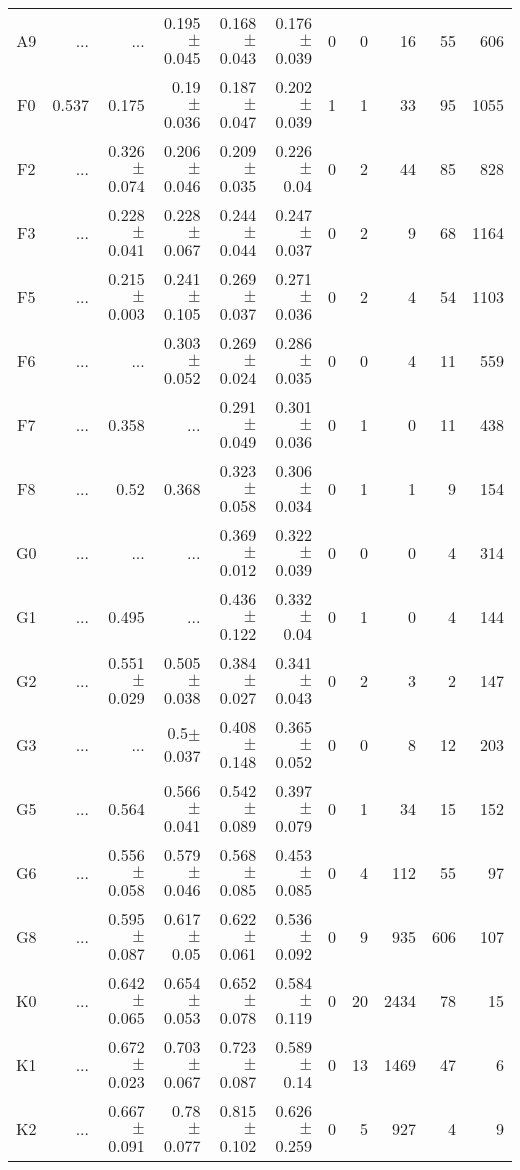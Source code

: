\begin{table}[t]
\begin{table}[t]
\begin{center}
\begin{tabular}{c|rrrrr|rrrrr}
    A9	&	 ...	&	 ...	&	0.195$\pm$0.045	&	0.168$\pm$0.043	&	0.176$\pm$0.039	&	0	&	0	&	16	&	55	&	606	\\
    F0	&	0.537	&	0.175	&	0.19$\pm$0.036	&	0.187$\pm$0.047	&	0.202$\pm$0.039	&	1	&	1	&	33	&	95	&	1055	\\
    F2	&	 ...	&	0.326$\pm$0.074	&	0.206$\pm$0.046	&	0.209$\pm$0.035	&	0.226$\pm$0.04	&	0	&	2	&	44	&	85	&	828	\\
    F3	&	 ...	&	0.228$\pm$0.041	&	0.228$\pm$0.067	&	0.244$\pm$0.044	&	0.247$\pm$0.037	&	0	&	2	&	9	&	68	&	1164	\\
    F5	&	 ...	&	0.215$\pm$0.003	&	0.241$\pm$0.105	&	0.269$\pm$0.037	&	0.271$\pm$0.036	&	0	&	2	&	4	&	54	&	1103	\\
    F6	&	 ...	&	 ...	&	0.303$\pm$0.052	&	0.269$\pm$0.024	&	0.286$\pm$0.035	&	0	&	0	&	4	&	11	&	559	\\
    F7	&	 ...	&	0.358	&	 ...	&	0.291$\pm$0.049	&	0.301$\pm$0.036	&	0	&	1	&	0	&	11	&	438	\\
    F8	&	 ...	&	0.52	&	0.368	&	0.323$\pm$0.058	&	0.306$\pm$0.034	&	0	&	1	&	1	&	9	&	154	\\
    G0	&	 ...	&	 ...	&	 ...	&	0.369$\pm$0.012	&	0.322$\pm$0.039	&	0	&	0	&	0	&	4	&	314	\\
    G1	&	 ...	&	0.495	&	 ...	&	0.436$\pm$0.122	&	0.332$\pm$0.04	&	0	&	1	&	0	&	4	&	144	\\
    G2	&	 ...	&	0.551$\pm$0.029	&	0.505$\pm$0.038	&	0.384$\pm$0.027	&	0.341$\pm$0.043	&	0	&	2	&	3	&	2	&	147	\\
    G3	&	 ...	&	 ...	&	0.5$\pm$0.037	&	0.408$\pm$0.148	&	0.365$\pm$0.052	&	0	&	0	&	8	&	12	&	203	\\
    G5	&	 ...	&	0.564	&	0.566$\pm$0.041	&	0.542$\pm$0.089	&	0.397$\pm$0.079	&	0	&	1	&	34	&	15	&	152	\\
    G6	&	 ...	&	0.556$\pm$0.058	&	0.579$\pm$0.046	&	0.568$\pm$0.085	&	0.453$\pm$0.085	&	0	&	4	&	112	&	55	&	97	\\
    G8	&	 ...	&	0.595$\pm$0.087	&	0.617$\pm$0.05	&	0.622$\pm$0.061	&	0.536$\pm$0.092	&	0	&	9	&	935	&	606	&	107	\\
    K0	&	 ...	&	0.642$\pm$0.065	&	0.654$\pm$0.053	&	0.652$\pm$0.078	&	0.584$\pm$0.119	&	0	&	20	&	2434	&	78	&	15	\\
    K1	&	 ...	&	0.672$\pm$0.023	&	0.703$\pm$0.067	&	0.723$\pm$0.087	&	0.589$\pm$0.14	&	0	&	13	&	1469	&	47	&	6	\\
    K2	&	 ...	&	0.667$\pm$0.091	&	0.78$\pm$0.077	&	0.815$\pm$0.102	&	0.626$\pm$0.259	&	0	&	5	&	927	&	4	&	9	\\

\end{tabular}
\end{center}
\end{table}
\end{table}
